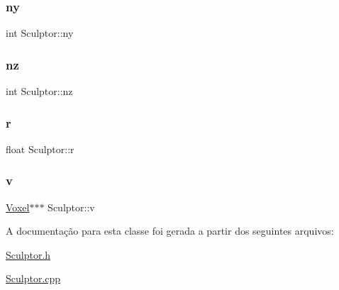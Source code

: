 \mbox{\label{classSculptor_a1ce2ff97ec94927928ab3f5ec4ba6761}} 
\subsubsection{\texorpdfstring{ny}{ny}}
{\footnotesize\ttfamily int Sculptor\+::ny\hspace{0.3cm}{\ttfamily [protected]}}

\mbox{\label{classSculptor_a33204e7df26a7ee4c7192381a24335d3}} 
\subsubsection{\texorpdfstring{nz}{nz}}
{\footnotesize\ttfamily int Sculptor\+::nz\hspace{0.3cm}{\ttfamily [protected]}}

\mbox{\label{classSculptor_a3f5d2ec3b66d645019b8d81c810a1cd8}} 
\subsubsection{\texorpdfstring{r}{r}}
{\footnotesize\ttfamily float Sculptor\+::r\hspace{0.3cm}{\ttfamily [protected]}}

\mbox{\label{classSculptor_a4ca53a2f2fbf41ca42dfe729ebe693f1}} 
\subsubsection{\texorpdfstring{v}{v}}
{\footnotesize\ttfamily \hyperlink{structVoxel}{Voxel}$\ast$$\ast$$\ast$ Sculptor\+::v\hspace{0.3cm}{\ttfamily [protected]}}



A documentação para esta classe foi gerada a partir dos seguintes arquivos\+:\begin{DoxyCompactItemize}
\item 
\hyperlink{Sculptor_8h}{Sculptor.\+h}\item 
\hyperlink{Sculptor_8cpp}{Sculptor.\+cpp}\end{DoxyCompactItemize}
